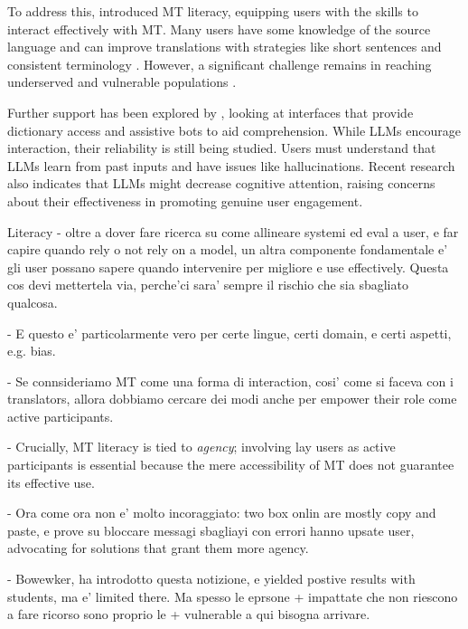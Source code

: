 To address this, \citet{bowker2019towards} introduced MT literacy, equipping users with the skills to interact effectively with MT. Many users have some knowledge of the source language and can improve translations with strategies like short sentences and consistent terminology \citep{Bowker01092020}. However, a significant challenge remains in reaching underserved and vulnerable populations \citep{Liebling}.

Further support has been explored by , looking at interfaces that provide dictionary access and assistive bots to aid comprehension. While LLMs encourage interaction, their reliability is still being studied. Users must understand that LLMs learn from past inputs and have issues like hallucinations. Recent research also indicates that LLMs might decrease cognitive attention, raising concerns about their effectiveness in promoting genuine user engagement.













Literacy
- oltre a dover fare ricerca su come allineare systemi ed eval a user, e far capire quando rely o not rely on a model, un altra componente fondamentale 
e' gli user possano sapere quando intervenire per migliore e use effectively. Questa cos devi mettertela via, perche'ci sara' sempre il rischio che sia sbagliato qualcosa. 

- E questo e' particolarmente vero  per certe lingue, certi domain, e certi aspetti, e.g. bias. 

- Se connsideriamo MT come una forma di interaction, cosi' come si faceva con i translators, allora dobbiamo cercare dei modi anche per empower their role come active participants. 

- Crucially, MT literacy is tied to \textit{agency}; involving lay users as active participants is essential because the mere accessibility of MT does not guarantee its effective use.

- Ora come ora non e' molto incoraggiato: two box onlin are mostly copy and paste, e prove su bloccare messagi sbagliayi con errori hanno upsate user, advocating for solutions that grant them more agency. 

- Bowewker, ha introdotto questa notizione, e yielded postive results with students, ma e' limited there. Ma spesso le eprsone + impattate che non riescono a fare ricorso sono proprio le + vulnerable a qui bisogna arrivare. 

